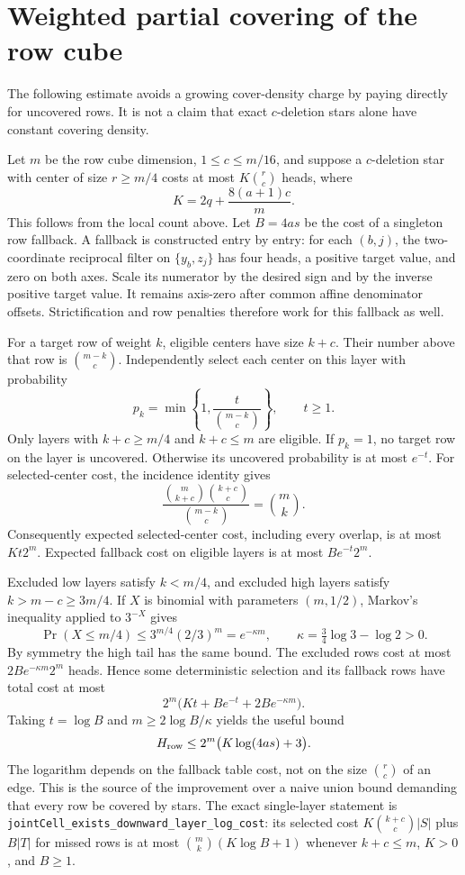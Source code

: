 \documentclass[11pt]{article}
\begin{document}
\section{Weighted partial covering of the row cube}

The following estimate avoids a growing cover-density charge by
paying directly for uncovered rows. It is not a claim that exact
$c$-deletion stars alone have constant covering density.

Let $m$ be the row cube dimension, $1\le c\le m/16$, and suppose a
$c$-deletion star with center of size $r\ge m/4$ costs at most
$K\binom rc$ heads, where
\[
 K=2q+\frac{8(a+1)c}{m}.
\]
This follows from the local count above. Let $B=4as$ be the cost of a
singleton row fallback. A fallback is constructed entry by entry:
for each $(b,j)$, the two-coordinate reciprocal filter on
$\{y_b,z_j\}$ has four heads, a positive target value, and zero on
both axes. Scale its numerator by the desired sign and by the inverse
positive target value. It remains axis-zero after common affine
denominator offsets. Strictification and row penalties therefore work
for this fallback as well.

For a target row of weight $k$, eligible centers have size $k+c$.
Their number above that row is $\binom{m-k}{c}$. Independently select
each center on this layer with probability
\[
 p_k=\min\left\{1,\frac{t}{\binom{m-k}{c}}\right\},\qquad t\ge1.
\]
Only layers with $k+c\ge m/4$ and $k+c\le m$ are eligible.
If $p_k=1$, no target row on the layer is uncovered. Otherwise its
uncovered probability is at most $e^{-t}$. For selected-center cost,
the incidence identity gives
\[
 \frac{\binom m{k+c}\binom{k+c}c}{\binom{m-k}c}
 =\binom mk.
\]
Consequently expected selected-center cost, including every overlap,
is at most $Kt2^m$. Expected fallback cost on eligible layers is at
most $Be^{-t}2^m$.

Excluded low layers satisfy $k<m/4$, and excluded high layers satisfy
$k>m-c\ge3m/4$. If $X$ is binomial with parameters $(m,1/2)$, Markov's
inequality applied to $3^{-X}$ gives
\[
 \Pr(X\le m/4)\le3^{m/4}(2/3)^m=e^{-\kappa m},
 \qquad \kappa=\tfrac34\log3-\log2>0.
\]
By symmetry the high tail has the same bound. The excluded rows cost
at most $2B e^{-\kappa m}2^m$ heads. Hence some deterministic
selection and its fallback rows have total cost at most
\[
 2^m\bigl(Kt+Be^{-t}+2Be^{-\kappa m}\bigr).
\]
Taking $t=\log B$ and $m\ge2\log B/\kappa$ yields the useful bound
\[
 H_{\rm row}\le2^m\bigl(K\log(4as)+3\bigr).
\]
The logarithm depends on the fallback table cost, not on the size
$\binom rc$ of an edge. This is the source of the improvement over
a naive union bound demanding that every row be covered by stars.
The exact single-layer statement is
\texttt{jointCell\_exists\_downward\_layer\_log\_cost}: its selected cost
$K\binom{k+c}{c}|S|$ plus $B|T|$ for missed rows is at most
$\binom mk(K\log B+1)$ whenever $k+c\le m$, $K>0$, and $B\ge1$.
\end{document}
